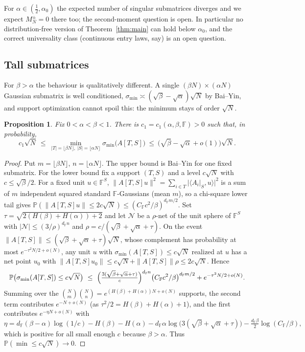 \documentclass[11pt,reqno]{amsart}
\theoremstyle{plain}
\newtheorem{proposition}[theorem]{Proposition}
\theoremstyle{definition}
\theoremstyle{remark}
\newcommand{\F}{\mathbb{F}}
\newcommand{\PP}{\mathbb{P}}
\newcommand{\smin}{\sigma_{\min}}
\newcommand{\dF}{d_{\F}}
\begin{document}
For $\alpha\in(\tfrac12,\alpha_0)$ the expected number of singular submatrices diverges and we
expect $M_N^{\pm}=0$ there too; the second-moment question is open. In particular no
distribution-free version of Theorem~\ref{thm:main} can hold below $\alpha_0$, and the correct
universality class (continuous entry laws, say) is an open question.

\subsection{Tall submatrices}
For $\beta>\alpha$ the behaviour is qualitatively different. A single $(\beta N)\times(\alpha N)$
Gaussian submatrix is well conditioned, $\smin\asymp(\sqrt\beta-\sqrt\alpha)\sqrt N$ by Bai--Yin, and
support optimization cannot spoil this: the minimum stays of order $\sqrt N$.

\begin{proposition}\label{prop:tall}
Fix $0<\alpha<\beta<1$. There is $c_1=c_1(\alpha,\beta,\F)>0$ such that, in probability,
\[
  c_1\sqrt N\ \le\ \min_{|T|=\lfloor\beta N\rfloor,\ |S|=\lfloor\alpha N\rfloor}\smin\bigl(A[T,S]\bigr)
  \ \le\ \bigl(\sqrt\beta-\sqrt\alpha+o(1)\bigr)\sqrt N .
\]
\end{proposition}

\begin{proof}
Put $m=\lfloor\beta N\rfloor$, $n=\lfloor\alpha N\rfloor$. The upper bound is Bai--Yin for one fixed
submatrix. For the lower bound fix a support $(T,S)$ and a level $c\sqrt N$ with $c\le\sqrt\beta/2$.
For a fixed unit $u\in\F^S$, $\|A[T,S]u\|^2=\sum_{i\in T}|\langle A_i|_S,u\rangle|^2$ is a sum of $m$
independent squared standard $\F$-Gaussians (mean $m$), so a chi-square lower tail gives
$\PP(\|A[T,S]u\|\le2c\sqrt N)\le(C_\F c^2/\beta)^{\dF m/2}$. Set $\tau=\sqrt{2(H(\beta)+H(\alpha))+2}$
and let $\mathcal N$ be a $\rho$-net of the unit sphere of $\F^S$ with $|\mathcal N|\le(3/\rho)^{\dF
n}$ and $\rho=c/(\sqrt\beta+\sqrt\alpha+\tau)$. On the event
$\|A[T,S]\|\le(\sqrt\beta+\sqrt\alpha+\tau)\sqrt N$, whose complement has probability at most
$e^{-\tau^2N/2+o(N)}$, any unit $u$ with $\smin(A[T,S])\le c\sqrt N$ realized at $u$ has a net point
$u_0$ with $\|A[T,S]u_0\|\le c\sqrt N+\|A[T,S]\|\rho\le2c\sqrt N$. Hence
\[
  \PP\bigl(\smin(A[T,S])\le c\sqrt N\bigr)\ \le\
  \Bigl(\tfrac{3(\sqrt\beta+\sqrt\alpha+\tau)}{c}\Bigr)^{\dF n}\bigl(C_\F c^2/\beta\bigr)^{\dF m/2}
  +e^{-\tau^2N/2+o(N)}.
\]
Summing over the $\binom Nm\binom Nn=e^{(H(\beta)+H(\alpha))N+o(N)}$ supports, the second term
contributes $e^{-N+o(N)}$ (as $\tau^2/2=H(\beta)+H(\alpha)+1$), and the first contributes
$e^{-\eta N+o(N)}$ with
\[
  \eta=\dF(\beta-\alpha)\log(1/c)-H(\beta)-H(\alpha)-\dF\alpha\log\bigl(3(\sqrt\beta+\sqrt\alpha+\tau)\bigr)
  -\tfrac{\dF\beta}2\log(C_\F/\beta),
\]
which is positive for all small enough $c$ because $\beta>\alpha$. Thus $\PP(\min\le c\sqrt N)\to0$.
\end{proof}
\end{document}
